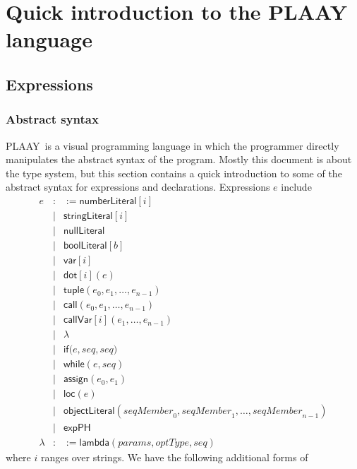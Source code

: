 \documentclass[12pt]{article}
\begin{document}
\section{Quick introduction to the PLAAY language}

\subsection{Expressions}

\subsubsection{Abstract syntax}

PLAAY\ is a visual programming language in which the programmer directly
manipulates the abstract syntax of the program. Mostly this document is
about the type system, but this section contains a quick introduction to
some of the abstract syntax for expressions and declarations. Expressions $e$
include%
\begin{eqnarray*}
e &:&:=\mathsf{numberLiteral}\left[ i\right] \\
&\mid &\mathsf{stringLiteral}[i] \\
&\mid &\mathsf{nullLiteral} \\
&\mid &\mathsf{boolLiteral}[b] \\
&\mid &\mathsf{var}[i] \\
&\mid &\mathsf{dot}\left[ i\right] (e) \\
&\mid &\mathsf{tuple}\left( e_{0},e_{1},\ldots ,e_{n-1}\right) \\
&\mid &\mathsf{call}(e_{0},e_{1},\ldots ,e_{n-1}) \\
&\mid &\mathsf{callVar}[i](e_{1},\ldots ,e_{n-1}) \\
&\mid &\lambda \\
&\mid &\mathsf{if}(e,\mathit{seq},\mathit{seq)} \\
&\mid &\mathsf{while}\left( e,\mathit{seq}\right) \\
&\mid &\mathsf{assign}(e_{0},e_{1}) \\
&\mid &\mathsf{loc}\left( e\right) \\
&\mid &\mathsf{objectLiteral}\left( \mathit{seqMember}_{0},\mathit{seqMember}%
_{1},\ldots ,\mathit{seqMember}_{n-1}\right) \\
&\mid &\mathsf{expPH} \\
\lambda &:&:=\mathsf{lambda}(\mathit{params},\mathit{optType,seq})
\end{eqnarray*}%
where $i$ ranges over strings. We have the following additional forms of
\end{document}

